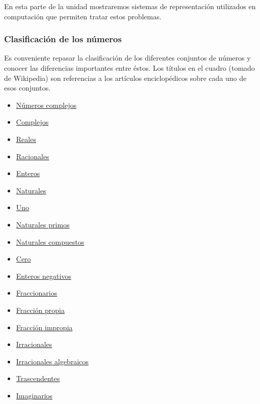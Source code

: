 \documentclass[spanish,A4,]{article}
\begin{document}
En esta parte de la unidad mostraremos sistemas de representación
utilizados en computación que permiten tratar estos problemas.

\subsubsection{Clasificación de los
números}\label{clasificaciuxf3n-de-los-nuxfameros}

Es conveniente repasar la clasificación de los diferentes conjuntos de
números y conocer las diferencias importantes entre éstos. Los títulos
en el cuadro (tomado de Wikipedia) son referencias a los artículos
enciclopédicos sobre cada uno de esos conjuntos.

\begin{itemize}
\itemsep1pt\parskip0pt
\item
  \href{https://es.m.wikipedia.org/wiki/N\%C3\%BAmero_complejo}{Números
  complejos}
\item
  \href{https://es.m.wikipedia.org/wiki/N\%C3\%BAmero_complejo}{Complejos}
\item
  \href{https://es.m.wikipedia.org/wiki/N\%C3\%BAmero_real}{Reales}
\item
  \href{https://es.m.wikipedia.org/wiki/N\%C3\%BAmero_racional}{Racionales}
\item
  \href{https://es.m.wikipedia.org/wiki/N\%C3\%BAmero_entero}{Enteros}
\item
  \href{https://es.m.wikipedia.org/wiki/N\%C3\%BAmero_natural}{Naturales}
\item
  \href{https://es.m.wikipedia.org/wiki/Uno}{Uno}
\item
  \href{https://es.m.wikipedia.org/wiki/N\%C3\%BAmero_primo}{Naturales
  primos}
\item
  \href{https://es.m.wikipedia.org/wiki/N\%C3\%BAmero_compuesto}{Naturales
  compuestos}
\item
  \href{https://es.m.wikipedia.org/wiki/Cero}{Cero}
\item
  \href{https://es.m.wikipedia.org/wiki/Entero_negativo}{Enteros
  negativos}
\item
  \href{https://es.m.wikipedia.org/wiki/N\%C3\%BAmero_fraccionario}{Fraccionarios}
\item
  \href{https://es.m.wikipedia.org/wiki/Fracci\%C3\%B3n_propia}{Fracción
  propia}
\item
  \href{https://es.m.wikipedia.org/wiki/Fracci\%C3\%B3n_impropia}{Fracción
  impropia}
\item
  \href{https://es.m.wikipedia.org/wiki/N\%C3\%BAmero_irracional}{Irracionales}
\item
  \href{https://es.m.wikipedia.org/wiki/N\%C3\%BAmero_algebraico}{Irracionales
  algebraicos}
\item
  \href{https://es.m.wikipedia.org/wiki/N\%C3\%BAmero_trascendente}{Trascendentes}
\item
  \href{https://es.m.wikipedia.org/wiki/N\%C3\%BAmero_imaginario}{Imaginarios}
\end{itemize}
\end{document}
